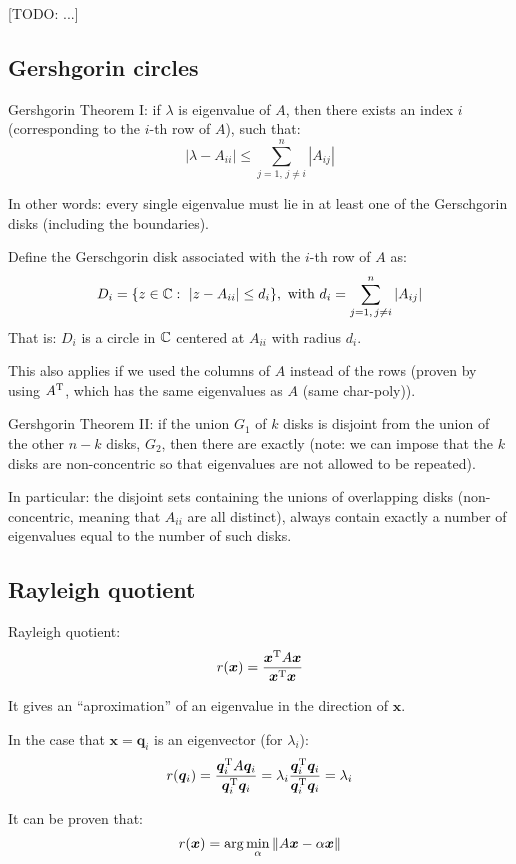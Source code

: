 \documentclass[
  12pt,
  paper=a4,
]{scrartcl} %
\begin{document}
[TODO: ...]


\subsection*{Gershgorin circles}

Gershgorin Theorem I: if $\lambda$ is eigenvalue of $A$, then there exists an index $i$ (corresponding to the $i$-th row of $A$), such that:
\[
    |\lambda - A_{ii}| \le
    \sum_{j=1,\,j\neq i}^n |A_{ij}|
\]

In other words: every single eigenvalue must lie in at least one of the Gerschgorin disks (including the boundaries).

Define the Gerschgorin disk associated with the $i$-th row of $A$ as:
\[
    D_i = \{z\in \mathbb C:\,\, |z-A_{ii}|\le d_i\},
    \text{ with } d_i = \sum_{j=1,\,j\neq i}^n |A_{ij}|
\]
That is: $D_i$ is a circle in $\mathbb C$ centered at $A_{ii}$ with radius $d_i$.

This also applies if we used the columns of $A$ instead of the rows (proven by using $A^{\mathrm{T}}$, which has the same eigenvalues as $A$ (same char-poly)).

Gershgorin Theorem II: if the union $G_1$ of $k$ disks is disjoint from the union of the other $n-k$ disks, $G_2$, then there are exactly 
(note: we can impose that the $k$ disks are non-concentric so that  eigenvalues are not allowed to be repeated).

In particular: 
the disjoint sets containing the unions of overlapping disks (non-concentric, meaning that $A_{ii}$ are all distinct), always contain exactly a number of eigenvalues equal to the number of such disks.

\subsection*{Rayleigh quotient}
Rayleigh quotient:
\[
    r(\bm x) = 
    \frac{
        \bm x^{\mathrm{T}} A \bm x
    }{
        \bm x^{\mathrm{T}} \bm x
    }
\]

It gives an ``aproximation'' of an eigenvalue in the direction of $\bm x$.

In the case that $\bm x = \bm q_i$ is an eigenvector (for $\lambda_i$):
\[
    r(\bm q_i) =
    \frac{
        \bm q_i^{\mathrm{T}} A \bm q_i
    }{
        \bm q_i^{\mathrm{T}} \bm q_i
    }
    =
    \lambda_i
    \frac{
        \bm q_i^{\mathrm{T}} \bm q_i
    }{
        \bm q_i^{\mathrm{T}} \bm q_i
    }
    =
    \lambda_i
\]

It can be proven that:
\[
    r(\bm x) = \arg\min_\alpha \|A\bm x - \alpha \bm x\|
\]
\end{document}

